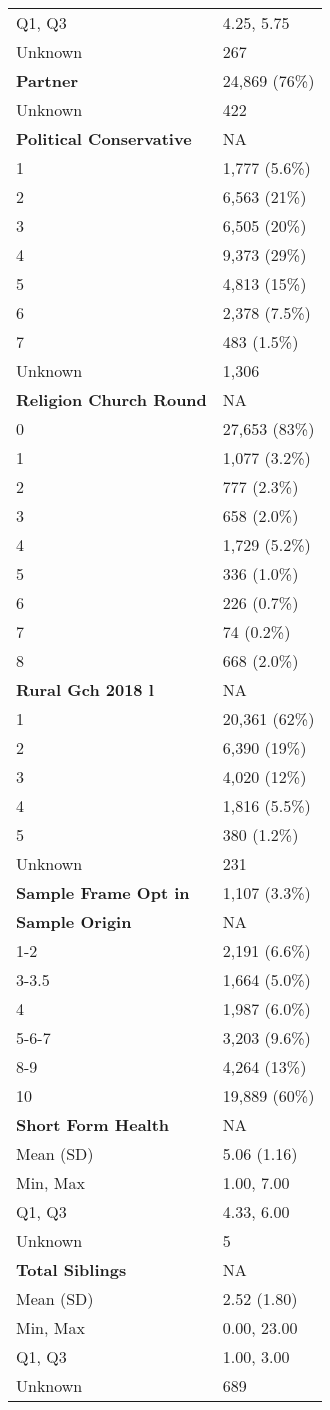 \documentclass[
  single column]{article}
\begin{document}
\begin{longtable}[]{@{}ll@{}}
Q1, Q3 & 4.25, 5.75 \\
Unknown & 267 \\
\textbf{Partner} & 24,869 (76\%) \\
Unknown & 422 \\
\textbf{Political Conservative} & NA \\
1 & 1,777 (5.6\%) \\
2 & 6,563 (21\%) \\
3 & 6,505 (20\%) \\
4 & 9,373 (29\%) \\
5 & 4,813 (15\%) \\
6 & 2,378 (7.5\%) \\
7 & 483 (1.5\%) \\
Unknown & 1,306 \\
\textbf{Religion Church Round} & NA \\
0 & 27,653 (83\%) \\
1 & 1,077 (3.2\%) \\
2 & 777 (2.3\%) \\
3 & 658 (2.0\%) \\
4 & 1,729 (5.2\%) \\
5 & 336 (1.0\%) \\
6 & 226 (0.7\%) \\
7 & 74 (0.2\%) \\
8 & 668 (2.0\%) \\
\textbf{Rural Gch 2018 l} & NA \\
1 & 20,361 (62\%) \\
2 & 6,390 (19\%) \\
3 & 4,020 (12\%) \\
4 & 1,816 (5.5\%) \\
5 & 380 (1.2\%) \\
Unknown & 231 \\
\textbf{Sample Frame Opt in} & 1,107 (3.3\%) \\
\textbf{Sample Origin} & NA \\
1-2 & 2,191 (6.6\%) \\
3-3.5 & 1,664 (5.0\%) \\
4 & 1,987 (6.0\%) \\
5-6-7 & 3,203 (9.6\%) \\
8-9 & 4,264 (13\%) \\
10 & 19,889 (60\%) \\
\textbf{Short Form Health} & NA \\
Mean (SD) & 5.06 (1.16) \\
Min, Max & 1.00, 7.00 \\
Q1, Q3 & 4.33, 6.00 \\
Unknown & 5 \\
\textbf{Total Siblings} & NA \\
Mean (SD) & 2.52 (1.80) \\
Min, Max & 0.00, 23.00 \\
Q1, Q3 & 1.00, 3.00 \\
Unknown & 689 \\

\end{longtable}
\end{document}
